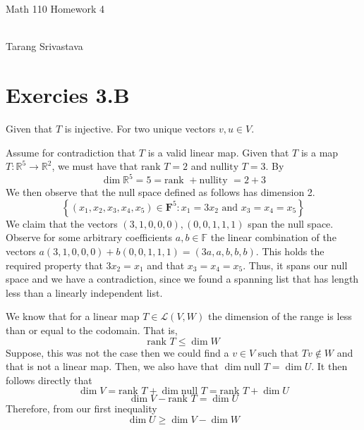 \documentclass[10pt, twocolumn]{article}
\author{Tarang Srivastava}
\newcommand{\R}{\mathbb{R}}
\newcommand{\F}{\mathbb{F}}
\newcommand{\LinearMap}[2]{\mathcal{L}(#1, #2)}
\newcommand{\nul}{\text{null }}
\newcommand{\nullity}{\text{nullity }}
\newcommand{\rank}{\text{rank }}
\newcommand{\makechaptertitle}[1]{
\begin{center}
	\begin{large}
		#1
	\end{large}
	\begin{small}
		\\Tarang Srivastava
	\end{small}
\end{center}
}
\begin{document}
	
\makechaptertitle{Math 110 Homework 4}

\section{Exercies 3.B}
\begin{q}[7]
    Given that $ T $ is injective. 
    For two unique vectors $ v, u \in V $. 
    
\end{q}

\begin{q}[15]
    Assume for contradiction that $ T $ is a valid linear map. 
    Given that $ T $ is a map $ T: \R^5 \to \R^2$, we must have that $ \rank T = 2 $ and $ \nullity T = 3 $. 
    By 
    $$ \dim \R^5 = 5 = \rank + \nullity = 2 + 3 $$
    We then observe that the null space defined as follows
    has dimension 2. 
    $$\left\{\left(x_{1}, x_{2}, x_{3}, x_{4}, x_{5}\right) \in \mathbf{F}^{5}: x_{1}=3 x_{2} \text { and } x_{3}=x_{4}=x_{5}\right\}$$
    We claim that the vectors $ (3, 1, 0, 0, 0), (0, 0, 1, 1, 1) $ span the null space. 
    Observe for some arbitrary coefficients $ a, b \in \F $ the linear combination of the vectors 
    $ a(3, 1, 0, 0, 0) + b(0, 0, 1, 1, 1) = (3a, a, b, b, b)$. 
    This holds the required property that $ 3x_2 = x_1 $ and that $ x_3 = x_4 = x_5 $. 
    Thus, it spans our null space and we have a contradiction, since we found a spanning list that has length less than a linearly independent list.  
\end{q}

\begin{q}[19]
    We know that for a linear map $ T \in \LinearMap{V}{W} $ the dimension of the range is less than or equal to the codomain.
    That is, 
    $$ \rank T \leq \dim W $$
    Suppose, this was not the case then we could find a $ v \in V $ such that $ Tv \not \in W $ and that is not a linear map. 
    Then, we also have that $ \dim \nul T = \dim U $. 
    It then follows directly that 
    $$ \dim V = \rank T + \dim \nul T = \rank T + \dim U $$
    $$ \dim V - \rank T = \dim U $$
    Therefore, from our first inequality 
    $$ \dim U \geq \dim V - \dim W $$
\end{q}

\begin{q}[26]
    
\end{q}
\end{document}
